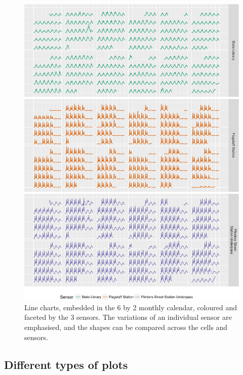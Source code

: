 \documentclass[article]{jss}
\begin{document}
\begin{CodeChunk}
\begin{figure}

{\centering \includegraphics[width=\textwidth]{figure/facet-1} 

}

\caption[Line charts, embedded in the 6 by 2 monthly calendar, coloured and faceted by the 3 sensors]{Line charts, embedded in the 6 by 2 monthly calendar, coloured and faceted by the 3 sensors. The variations of an individual sensor are emphasised, and the shapes can be compared across the cells and sensors.}\label{fig:facet}
\end{figure}
\end{CodeChunk}

\subsection{Different types of plots}\label{different-types-of-plots}
\end{document}
